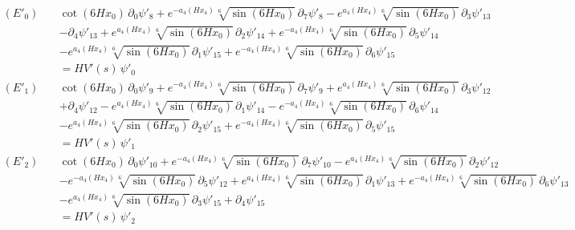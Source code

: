 \begin{align*}
(E'_{0})\quad & \cot \left(6 H x_0\right)\,\partial_{0}\psi'_{8} + e^{-a_4\left(H x_4\right)} \sqrt[6]{\sin \left(6 H x_0\right)}\,\partial_{7}\psi'_{8} - e^{a_4\left(H x_4\right)} \sqrt[6]{\sin \left(6 H x_0\right)}\,\partial_{3}\psi'_{13} \\
 &  - \partial_{4}\psi'_{13} + e^{a_4\left(H x_4\right)} \sqrt[6]{\sin \left(6 H x_0\right)}\,\partial_{2}\psi'_{14} + e^{-a_4\left(H x_4\right)} \sqrt[6]{\sin \left(6 H x_0\right)}\,\partial_{5}\psi'_{14} \\
 &  - e^{a_4\left(H x_4\right)} \sqrt[6]{\sin \left(6 H x_0\right)}\,\partial_{1}\psi'_{15} + e^{-a_4\left(H x_4\right)} \sqrt[6]{\sin \left(6 H x_0\right)}\,\partial_{6}\psi'_{15} \\
 & = H V'(s)\,\psi'_{0}
\end{align*}
\begin{align*}
(E'_{1})\quad & \cot \left(6 H x_0\right)\,\partial_{0}\psi'_{9} + e^{-a_4\left(H x_4\right)} \sqrt[6]{\sin \left(6 H x_0\right)}\,\partial_{7}\psi'_{9} + e^{a_4\left(H x_4\right)} \sqrt[6]{\sin \left(6 H x_0\right)}\,\partial_{3}\psi'_{12} \\
 &  + \partial_{4}\psi'_{12} - e^{a_4\left(H x_4\right)} \sqrt[6]{\sin \left(6 H x_0\right)}\,\partial_{1}\psi'_{14} - e^{-a_4\left(H x_4\right)} \sqrt[6]{\sin \left(6 H x_0\right)}\,\partial_{6}\psi'_{14} \\
 &  - e^{a_4\left(H x_4\right)} \sqrt[6]{\sin \left(6 H x_0\right)}\,\partial_{2}\psi'_{15} + e^{-a_4\left(H x_4\right)} \sqrt[6]{\sin \left(6 H x_0\right)}\,\partial_{5}\psi'_{15} \\
 & = H V'(s)\,\psi'_{1}
\end{align*}
\begin{align*}
(E'_{2})\quad & \cot \left(6 H x_0\right)\,\partial_{0}\psi'_{10} + e^{-a_4\left(H x_4\right)} \sqrt[6]{\sin \left(6 H x_0\right)}\,\partial_{7}\psi'_{10} - e^{a_4\left(H x_4\right)} \sqrt[6]{\sin \left(6 H x_0\right)}\,\partial_{2}\psi'_{12} \\
 &  - e^{-a_4\left(H x_4\right)} \sqrt[6]{\sin \left(6 H x_0\right)}\,\partial_{5}\psi'_{12} + e^{a_4\left(H x_4\right)} \sqrt[6]{\sin \left(6 H x_0\right)}\,\partial_{1}\psi'_{13} + e^{-a_4\left(H x_4\right)} \sqrt[6]{\sin \left(6 H x_0\right)}\,\partial_{6}\psi'_{13} \\
 &  - e^{a_4\left(H x_4\right)} \sqrt[6]{\sin \left(6 H x_0\right)}\,\partial_{3}\psi'_{15} + \partial_{4}\psi'_{15} \\
 & = H V'(s)\,\psi'_{2}
\end{align*}
